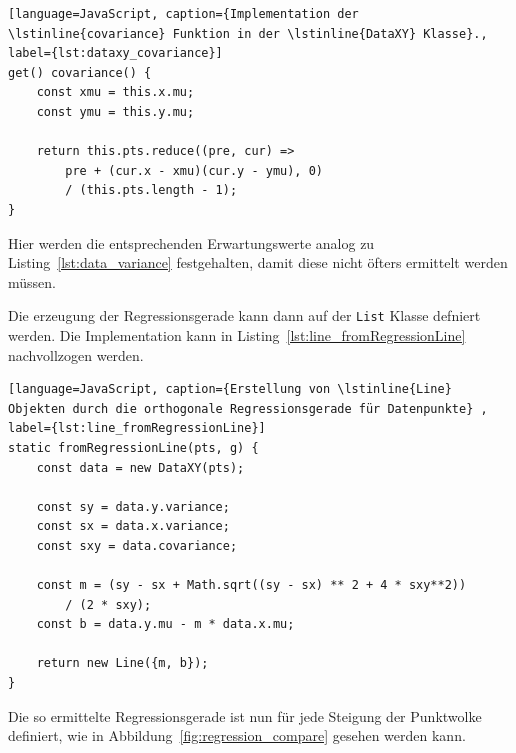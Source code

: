 \begin{lstlisting}[language=JavaScript, caption={Implementation der \lstinline{covariance} Funktion in der \lstinline{DataXY} Klasse}., label={lst:dataxy_covariance}]
get() covariance() {
    const xmu = this.x.mu;
    const ymu = this.y.mu;

    return this.pts.reduce((pre, cur) =>
        pre + (cur.x - xmu)(cur.y - ymu), 0)
        / (this.pts.length - 1);
}
\end{lstlisting}

Hier werden die entsprechenden Erwartungswerte analog zu Listing~\ref{lst:data_variance} festgehalten, damit diese nicht öfters ermittelt werden müssen.

Die erzeugung der Regressionsgerade kann dann auf der \lstinline{List} Klasse defniert werden.
Die Implementation kann in Listing~\ref{lst:line_fromRegressionLine} nachvollzogen werden.

\begin{lstlisting}[language=JavaScript, caption={Erstellung von \lstinline{Line} Objekten durch die orthogonale Regressionsgerade für Datenpunkte} , label={lst:line_fromRegressionLine}]
static fromRegressionLine(pts, g) {
    const data = new DataXY(pts);

    const sy = data.y.variance;
    const sx = data.x.variance;
    const sxy = data.covariance;

    const m = (sy - sx + Math.sqrt((sy - sx) ** 2 + 4 * sxy**2)) 
        / (2 * sxy);
    const b = data.y.mu - m * data.x.mu;

    return new Line({m, b});
}
\end{lstlisting}

Die so ermittelte Regressionsgerade ist nun für jede Steigung der Punktwolke definiert, wie in Abbildung~\ref{fig:regression_compare} gesehen werden kann.


